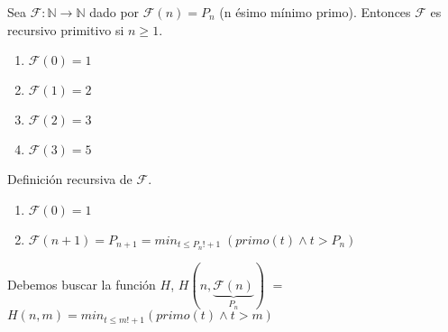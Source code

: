 \begin{example}
Sea $\mathcal{F} \colon \mathbb{N} \rightarrow \mathbb{N}$ dado por $\mathcal{F}(n) = P_n$ (n \'esimo m\'inimo primo). Entonces $\mathcal{F}$ es recursivo primitivo si $n \geq 1$.
 
\begin{enumerate}
	\item[] $\mathcal{F}(0) = 1$
	\item[] $\mathcal{F}(1) = 2$
	\item[] $\mathcal{F}(2) = 3$
	\item[] $\mathcal{F}(3) = 5$
\end{enumerate}
 
Definici\'on recursiva de $\mathcal{F}$.
 
\begin{enumerate}
	\item[]$\mathcal{F}(0) = 1$
	\item[]$\mathcal{F}(n + 1) = P_{n + 1} = min_{t \leq P_n! + 1}\;(primo(t) \land t > P_n)$
\end{enumerate}
 
Debemos buscar la funci\'on $H$, $H(n, \underbrace{\mathcal{F}(n)}_{P_n})$ $=$ $H(n, m) = min_{t \leq m! + 1} (primo(t) \land t > m)$
\end{example}
 
 
